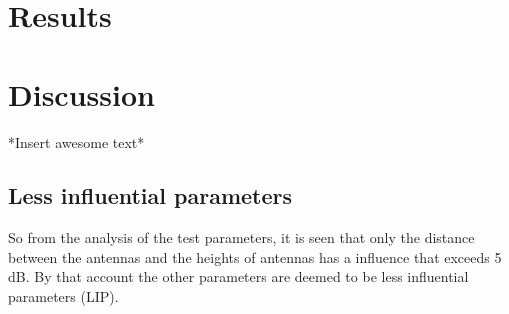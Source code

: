 \section{Results}


\section{Discussion}

*Insert awesome text*

\subsection{Less influential parameters}

So from the analysis of the test parameters, it is seen that only the distance between the antennas and the heights of antennas has a influence that exceeds 5 dB. By that account the other parameters are deemed to be less influential parameters (LIP). 






